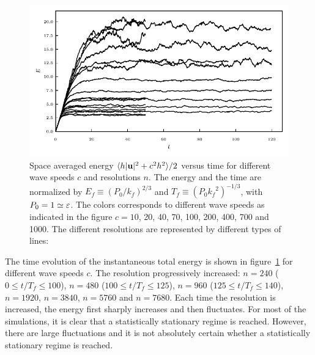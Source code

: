 \begin{figure}
\centerline{\includegraphics[width=5.12in]{../Pyfig/fig_Emean_time}}
\caption{Space averaged energy 
$\langle h|\textbf{u}|^2 + c^2 h^2 \rangle/2$ versus time 
for different wave speeds $c$ and resolutions $n$.
%
The energy and the time are normalized by 
$E_f\equiv (P_0/k_f)^{2/3}$ and $T_f\equiv (P_0 {k_f}^2)^{-1/3}$,
with $P_0 = 1 \simeq \varepsilon$.
%
The colors corresponds to different wave speeds as indicated in the figure
$c= 10$, 20, 40, 70, 100, 200, 400, 700 and 1000.
%
The different resolutions are represented by different types of lines:
}
\label{fig_Evstime}
\end{figure}






The time evolution of the instantaneous total energy is shown in
figure~\ref{fig_Evstime} for different wave speeds $c$.
%
The resolution  progressively
increased: %
$n = 240$ ($0\leqslant t/T_f \leqslant 100$), %
$n = 480$ ($100\leqslant t/T_f \leqslant 125$), %
$n = 960$ ($125\leqslant t/T_f \leqslant 140$), %
$n = 1920$, %
$n = 3840$, %
$n = 5760$ and %
$n = 7680$.
%
Each time the resolution is increased, the energy first sharply
increases and then fluctuates.  For most of the simulations, it is
clear that a statistically stationary regime is reached.
%
However, 
%
%
%
there are large fluctuations and it is not absolutely certain whether
a statistically stationary regime is reached.
%
%


